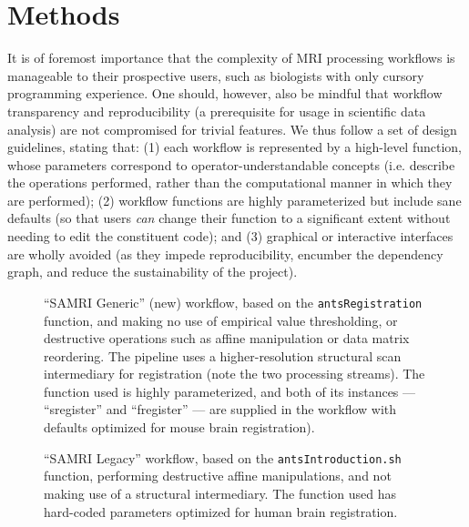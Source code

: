 \section{Methods}
It is of foremost importance that the complexity of MRI processing workflows is manageable to their prospective users, such as biologists with only cursory programming experience.
One should, however, also be mindful that workflow transparency and reproducibility (a prerequisite for usage in scientific data analysis) are not compromised for trivial features.
We thus follow  a set of design guidelines, stating that:
(1) each workflow is represented by a high-level function, whose parameters correspond to operator-understandable concepts (i.e. describe the operations performed, rather than the computational manner in which they are performed);
(2) workflow functions are highly parameterized but include sane defaults (so that users \textit{can} change their function to a significant extent without needing to edit the constituent code);
and (3) graphical or interactive interfaces are wholly avoided (as they impede reproducibility, encumber the dependency graph, and reduce the sustainability of the project).

\begin{figure*}[h!]
	\begin{subfigure}{.64\textwidth}
		\centering
		\vspace{1.4em}
		\caption{
			“SAMRI Generic” (new) workflow, based on the \textcolor{mg}{\texttt{antsRegistration}} function, and making no use of empirical value thresholding, or destructive operations such as affine manipulation or data matrix reordering.
			The pipeline uses a higher-resolution structural scan intermediary for registration (note the two processing streams).
			The function used is highly parameterized, and both of its instances --- “s\niceus register” and “f\niceus register” --- are supplied in the workflow with defaults optimized for mouse brain registration).
			}
		\label{fig:wfgg}
	\end{subfigure}\hfill
	\begin{subfigure}{.34\textwidth}
		\centering
		\vspace{-1.9em}
		\caption{
			“SAMRI Legacy” workflow, based on the \textcolor{mg}{\texttt{antsIntroduction.sh}} function, performing destructive affine manipulations, and not making use of a structural intermediary.
			The function used has hard-coded parameters optimized for human brain registration.
			}
		\label{fig:wfgl}
	\end{subfigure}
	\caption{
		Directed acyclic graphs depicting the two alternate MRI registration workflows and their constituent processing steps.
		The package correspondence of each processing node is appended in parantheses to the node name.
		The “utility” indication corresponds to nodes based on Python functions specific to the workflow, distributed alongside it, and dynamically wrapped via Nipype.
		The “extra\niceus interfaces” indication corresponds to nodes using explicitly defined Nipype-style interfaces, which are specific to the workflow and distributed alongside it.
		}
	\label{fig:wfg}
\end{figure*}

